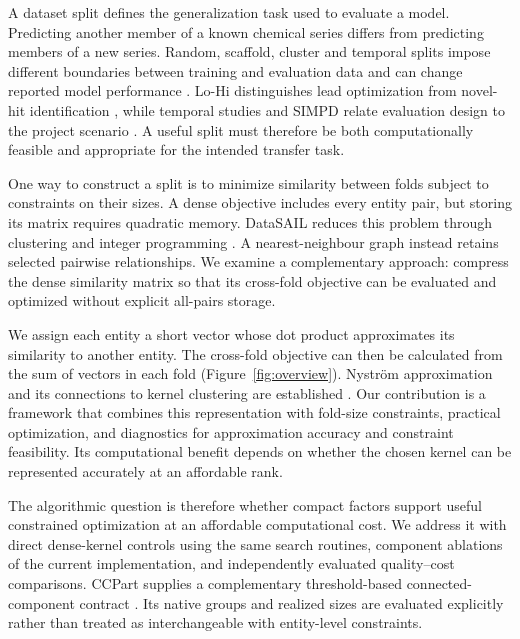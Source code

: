 \documentclass[12pt]{article}
\begin{document}
A dataset split defines the generalization task used to evaluate a model.
Predicting another member of a known chemical series differs from predicting
members of a new series. Random, scaffold, cluster and temporal splits impose
different boundaries between training and evaluation data and can change
reported model performance \citep{wu2018moleculenet,yang2019representations}.
Lo-Hi distinguishes lead optimization from novel-hit identification
\citep{steshin2023lohi}, while temporal studies and SIMPD relate evaluation
design to the project scenario \citep{sheridan2013timesplit,landrum2023simpd}.
A useful split must therefore be both computationally feasible and appropriate
for the intended transfer task.

One way to construct a split is to minimize similarity between folds subject to
constraints on their sizes. A dense objective includes every entity pair, but
storing its matrix requires quadratic memory. DataSAIL reduces this problem
through clustering and integer programming
\citep{joeres2025datasail,joeres2026datasailaddendum}. A nearest-neighbour
graph instead retains selected pairwise relationships. We examine a
complementary approach: compress the dense similarity matrix so that its
cross-fold objective can be evaluated and optimized without explicit all-pairs
storage.

We assign each entity a short vector whose dot product approximates its
similarity to another entity. The cross-fold objective can then be calculated
from the sum of vectors in each fold (Figure~\ref{fig:overview}). Nystr\"om
approximation and its connections to kernel clustering are established
\citep{williams2000nystrom,dhillon2004kernel,gittens2016nystrom,wang2019scalablekernel,chitta2011}.
Our contribution is a framework that combines this representation with
fold-size constraints, practical optimization, and diagnostics for
approximation accuracy and constraint feasibility. Its computational benefit
depends on whether the chosen kernel can be represented accurately at an
affordable rank.

The algorithmic question is therefore whether compact factors support useful
constrained optimization at an affordable computational cost. We address it
with direct dense-kernel controls using the same search routines, component
ablations of the current implementation, and independently evaluated
quality--cost comparisons. CCPart supplies a complementary threshold-based
connected-component contract \citep{fernandez2024hestia}. Its native groups and
realized sizes are evaluated explicitly rather than treated as interchangeable
with entity-level constraints.
\end{document}
